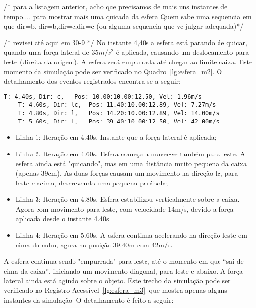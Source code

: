 \documentclass[12pt]{article}
\begin{document}
/* para a listagem anterior, acho que precisamos de mais uns instantes de tempo.... para mostrar mais uma quicada da esfera Quem sabe uma sequencia em que dir=b, dir=b,dir=c,dir=c	(ou alguma sequencia que vc julgar adequada)*/ 



/* revisei até aqui em 30-9 */ 
No instante 4,40s a esfera está parando de quicar, quando uma força lateral de $35m/s^{2}$ é aplicada, causando um deslocamento para leste (direita da origem). A esfera será empurrada até chegar ao limite caixa. Este momento da simulação pode ser verificado no Quadro~\ref{lg:esfera_m2}. O detalhamento dos eventos registrados encontra-se a seguir:



\begin{lstlisting}[frame=single,caption=Registro Acessível: Esfera sobre a caixa. \label{lg:esfera_m2}]
	T: 4.40s, Dir: c, 	Pos: 10.00:10.00:12.50, Vel: 1.96m/s
	T: 4.60s, Dir: lc, 	Pos: 11.40:10.00:12.89, Vel: 7.27m/s
	T: 4.80s, Dir: l, 	Pos: 14.20:10.00:12.89, Vel: 14.00m/s
	T: 5.60s, Dir: l, 	Pos: 39.40:10.00:12.50, Vel: 42.00m/s
\end{lstlisting}

\begin{itemize}
	\item Linha 1: Iteração em 4.40s. Instante que a força lateral é aplicada;
	\item Linha 2: Iteração em 4.60s. Esfera começa a mover-se também para leste. A esfera ainda está "quicando", mas em uma distância muito pequena da caixa (apenas 39cm). As duas forças causam um movimento na direção lc, para leste e acima, descrevendo uma pequena parábola;
	\item Linha 3: Iteração em 4.80s. Esfera estabilizou verticalmente sobre a caixa. Agora com movimento para leste, com velocidade 14m/s, devido a força aplicada desde o instante 4.40s; 
	\item Linha 4: Iteração em 5.60s. A esfera continua acelerando na direção leste em cima do cubo, agora na posição 39.40m com 42m/s.
\end{itemize}

A esfera continua sendo "empurrada" para leste, até o momento em que “sai de cima da caixa”, iniciando um movimento diagonal, para leste e abaixo. A força lateral ainda está agindo sobre o objeto. Este trecho da simulação pode ser verificado no Registro Acessível~\ref{lg:esfera_m3}, que mostra apenas alguns instantes da simulação. O detalhamento é feito a seguir:
\end{document}
